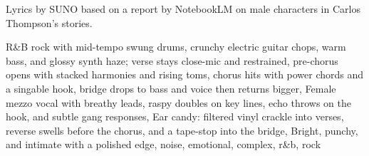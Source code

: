 
\begin{notes}
Lyrics by SUNO based on a report by NotebookLM on male characters in Carlos Thompson's stories.
\end{notes}
\begin{style}
R\&B rock with mid-tempo swung drums, crunchy electric guitar chops, warm bass, and glossy synth haze; verse stays close-mic and restrained, pre-chorus opens with stacked harmonies and rising toms, chorus hits with power chords and a singable hook, bridge drops to bass and voice then returns bigger, Female mezzo vocal with breathy leads, raspy doubles on key lines, echo throws on the hook, and subtle gang responses, Ear candy: filtered vinyl crackle into verses, reverse swells before the chorus, and a tape-stop into the bridge, Bright, punchy, and intimate with a polished edge, noise, emotional, complex, r\&b, rock
\end{style}
